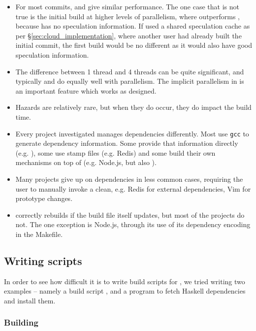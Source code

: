 \begin{itemize}
\item For most commits, \Rattle and \Make give similar performance. The one case that is not true is the initial build at higher levels of parallelism, where \Make outperforms \Rattle, because \Rattle has no speculation information. If \Rattle used a shared speculation cache as per \S\ref{sec:cloud_implementation}, where another user had already built the initial commit, the first build would be no different as it would also have good speculation information.
\item The difference between 1 thread and 4 threads can be quite significant, and typically \Make and \Rattle do equally well with parallelism. The implicit parallelism in \Rattle is an important feature which works as designed.
\item Hazards are relatively rare, but when they do occur, they do impact the build time.
\item Every \Make project investigated manages dependencies differently. Most use \texttt{gcc} to generate dependency information. Some provide that information directly (e.g. \Fsatrace), some use stamp files (e.g. Redis) and some build their own mechanisms on top of \Make (e.g. Node.js, but also \citet[\S2]{hadrian}).
\item Many projects give up on dependencies in less common cases, requiring the user to manually invoke a clean, e.g. Redis for external dependencies, Vim for prototype changes.
\item \Rattle correctly rebuilds if the build file itself updates, but most of the \Make projects do not. The one exception is Node.js, through its use of its dependency encoding in the Makefile.
\end{itemize}


\subsection{Writing \Rattle scripts}
\label{sec:eval:writing_rattle}

In order to see how difficult it is to write build scripts for \Rattle, we tried writing two examples -- namely a build script \Fsatrace, and a program to fetch Haskell dependencies and install them.

\subsubsection{Building \Fsatrace}

